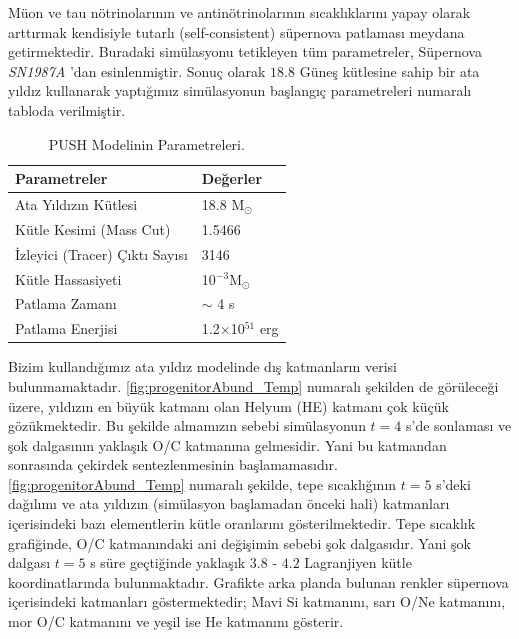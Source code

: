 Müon ve tau nötrinolarının ve antinötrinolarının sıcaklıklarını yapay olarak arttırmak kendisiyle tutarlı (self-consistent) süpernova patlaması meydana getirmektedir. Buradaki simülasyonu tetikleyen tüm parametreler, Süpernova \textit{SN1987A} 'dan esinlenmiştir. Sonuç olarak $ 18.8 $ Güneş kütlesine sahip bir ata yıldız kullanarak yaptığımız simülasyonun başlangıç parametreleri numaralı tabloda verilmiştir.
\begin{table}[hbt!]
    \centering
    \begin{tabular}{|l|l|}
    \hline
    \textbf{Parametreler} & \textbf{Değerler} \\ \hline
    Ata Yıldızın Kütlesi & 18.8 M$_{\odot}$ \\ \hline
    Kütle Kesimi (Mass Cut) & 1.5466 \\ \hline
    İzleyici (Tracer) Çıktı Sayısı & 3146 \\ \hline
    Kütle Hassasiyeti & 10$ ^{-3} $M$_{\odot}$\\ \hline
    Patlama Zamanı & $ \sim $ 4 s \\ \hline
    Patlama Enerjisi & 1.2$\times  $10$ ^{51} $ erg \\ \hline
    \end{tabular} 
    \caption[PUSH Modelinin Parametreleri.]{PUSH Modelinin Parametreleri.} 
    \label{table:ProgenitorParameters}
\end{table}

Bizim kullandığımız ata yıldız modelinde dış katmanların verisi bulunmamaktadır. \ref{fig:progenitorAbund_Temp} numaralı şekilden de görüleceği üzere, yıldızın en büyük katmanı olan Helyum (HE) katmanı çok küçük gözükmektedir. Bu şekilde almamızın sebebi simülasyonun $ t=4 $ s'de sonlaması ve şok dalgasının yaklaşık O/C katmanına gelmesidir. Yani bu katmandan sonrasında çekirdek sentezlenmesinin başlamamasıdır. \ref{fig:progenitorAbund_Temp} numaralı şekilde, tepe sıcaklığının $ t=5 $ s'deki dağılımı ve ata yıldızın (simülasyon başlamadan önceki hali) katmanları içerisindeki bazı elementlerin kütle oranlarını gösterilmektedir. Tepe sıcaklık grafiğinde, O/C katmanındaki ani değişimin sebebi şok dalgasıdır. Yani şok dalgası $ t=5 $ s süre geçtiğinde yaklaşık $3.8$ - $4.2$ Lagranjiyen kütle koordinatlarında bulunmaktadır. Grafikte arka planda bulunan renkler süpernova içerisindeki katmanları göstermektedir; Mavi Si katmanını, sarı O/Ne katmanını, mor O/C katmanını ve yeşil ise He katmanını gösterir. 

